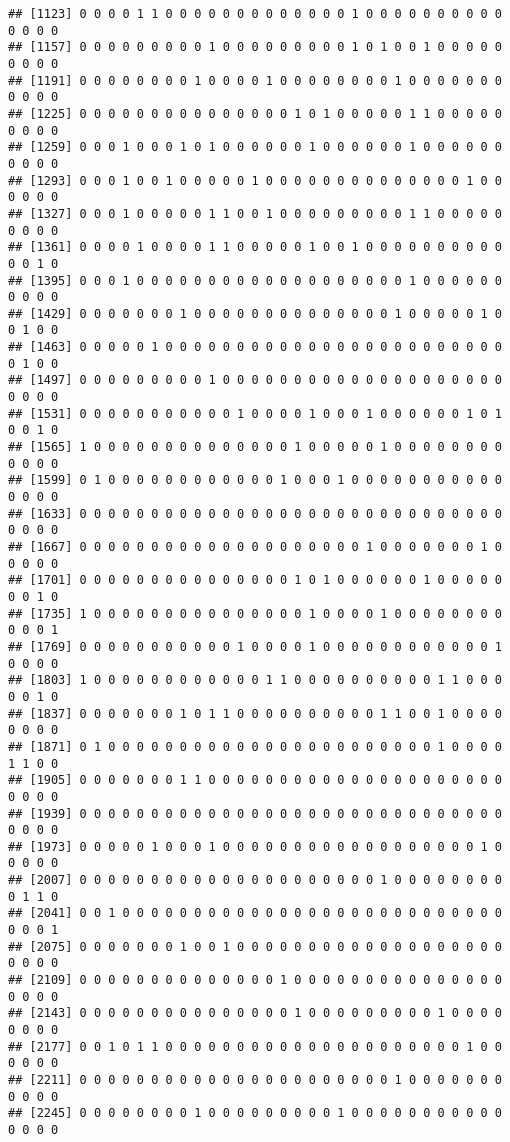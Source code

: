 \documentclass[]{article}
\begin{document}
\begin{verbatim}
## [1123] 0 0 0 0 1 1 0 0 0 0 0 0 0 0 0 0 0 0 0 1 0 0 0 0 0 0 0 0 0 0 0 0 0 0
## [1157] 0 0 0 0 0 0 0 0 0 1 0 0 0 0 0 0 0 0 0 1 0 1 0 0 1 0 0 0 0 0 0 0 0 0
## [1191] 0 0 0 0 0 0 0 0 1 0 0 0 0 1 0 0 0 0 0 0 0 0 1 0 0 0 0 0 0 0 0 0 0 0
## [1225] 0 0 0 0 0 0 0 0 0 0 0 0 0 0 0 1 0 1 0 0 0 0 0 1 1 0 0 0 0 0 0 0 0 0
## [1259] 0 0 0 1 0 0 0 1 0 1 0 0 0 0 0 0 1 0 0 0 0 0 0 1 0 0 0 0 0 0 0 0 0 0
## [1293] 0 0 0 1 0 0 1 0 0 0 0 0 1 0 0 0 0 0 0 0 0 0 0 0 0 0 0 1 0 0 0 0 0 0
## [1327] 0 0 0 1 0 0 0 0 0 1 1 0 0 1 0 0 0 0 0 0 0 0 0 1 1 0 0 0 0 0 0 0 0 0
## [1361] 0 0 0 0 1 0 0 0 0 1 1 0 0 0 0 0 1 0 0 1 0 0 0 0 0 0 0 0 0 0 0 0 1 0
## [1395] 0 0 0 1 0 0 0 0 0 0 0 0 0 0 0 0 0 0 0 0 0 0 0 1 0 0 0 0 0 0 0 0 0 0
## [1429] 0 0 0 0 0 0 0 1 0 0 0 0 0 0 0 0 0 0 0 0 0 0 1 0 0 0 0 0 1 0 0 1 0 0
## [1463] 0 0 0 0 0 1 0 0 0 0 0 0 0 0 0 0 0 0 0 0 0 0 0 0 0 0 0 0 0 0 0 1 0 0
## [1497] 0 0 0 0 0 0 0 0 0 1 0 0 0 0 0 0 0 0 0 0 0 0 0 0 0 0 0 0 0 0 0 0 0 0
## [1531] 0 0 0 0 0 0 0 0 0 0 0 1 0 0 0 0 1 0 0 0 1 0 0 0 0 0 0 1 0 1 0 0 1 0
## [1565] 1 0 0 0 0 0 0 0 0 0 0 0 0 0 0 1 0 0 0 0 0 1 0 0 0 0 0 0 0 0 0 0 0 0
## [1599] 0 1 0 0 0 0 0 0 0 0 0 0 0 0 1 0 0 0 1 0 0 0 0 0 0 0 0 0 0 0 0 0 0 0
## [1633] 0 0 0 0 0 0 0 0 0 0 0 0 0 0 0 0 0 0 0 0 0 0 0 0 0 0 0 0 0 0 0 0 0 0
## [1667] 0 0 0 0 0 0 0 0 0 0 0 0 0 0 0 0 0 0 0 0 1 0 0 0 0 0 0 0 1 0 0 0 0 0
## [1701] 0 0 0 0 0 0 0 0 0 0 0 0 0 0 0 1 0 1 0 0 0 0 0 0 1 0 0 0 0 0 0 0 1 0
## [1735] 1 0 0 0 0 0 0 0 0 0 0 0 0 0 0 0 1 0 0 0 0 1 0 0 0 0 0 0 0 0 0 0 0 1
## [1769] 0 0 0 0 0 0 0 0 0 0 0 1 0 0 0 0 1 0 0 0 0 0 0 0 0 0 0 0 0 1 0 0 0 0
## [1803] 1 0 0 0 0 0 0 0 0 0 0 0 0 1 1 0 0 0 0 0 0 0 0 0 0 1 1 0 0 0 0 0 1 0
## [1837] 0 0 0 0 0 0 0 1 0 1 1 0 0 0 0 0 0 0 0 0 0 1 1 0 0 1 0 0 0 0 0 0 0 0
## [1871] 0 1 0 0 0 0 0 0 0 0 0 0 0 0 0 0 0 0 0 0 0 0 0 0 0 1 0 0 0 0 1 1 0 0
## [1905] 0 0 0 0 0 0 0 1 1 0 0 0 0 0 0 0 0 0 0 0 0 0 0 0 0 0 0 0 0 0 0 0 0 0
## [1939] 0 0 0 0 0 0 0 0 0 0 0 0 0 0 0 0 0 0 0 0 0 0 0 0 0 0 0 0 0 0 0 0 0 0
## [1973] 0 0 0 0 0 1 0 0 0 1 0 0 0 0 0 0 0 0 0 0 0 0 0 0 0 0 0 0 1 0 0 0 0 0
## [2007] 0 0 0 0 0 0 0 0 0 0 0 0 0 0 0 0 0 0 0 0 0 1 0 0 0 0 0 0 0 0 0 1 1 0
## [2041] 0 0 1 0 0 0 0 0 0 0 0 0 0 0 0 0 0 0 0 0 0 0 0 0 0 0 0 0 0 0 0 0 0 1
## [2075] 0 0 0 0 0 0 0 1 0 0 1 0 0 0 0 0 0 0 0 0 0 0 0 0 0 0 0 0 0 0 0 0 0 0
## [2109] 0 0 0 0 0 0 0 0 0 0 0 0 0 0 1 0 0 0 0 0 0 0 0 0 0 0 0 0 0 0 0 0 0 0
## [2143] 0 0 0 0 0 0 0 0 0 0 0 0 0 0 0 1 0 0 0 0 0 0 0 0 0 1 0 0 0 0 0 0 0 0
## [2177] 0 0 1 0 1 1 0 0 0 0 0 0 0 0 0 0 0 0 0 0 0 0 0 0 0 0 0 1 0 0 0 0 0 0
## [2211] 0 0 0 0 0 0 0 0 0 0 0 0 0 0 0 0 0 0 0 0 0 0 1 0 0 0 0 0 0 0 0 0 0 0
## [2245] 0 0 0 0 0 0 0 0 1 0 0 0 0 0 0 0 0 0 1 0 0 0 0 0 0 0 0 0 0 0 0 0 0 0

\end{verbatim}
\end{document}
